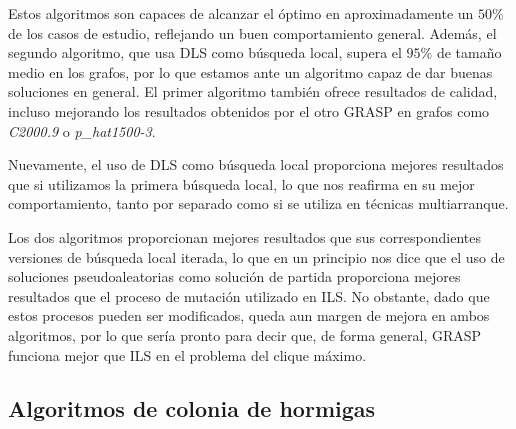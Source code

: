Estos algoritmos son capaces de alcanzar el óptimo en aproximadamente un $50\%$ de
los casos de estudio, reflejando un buen comportamiento general. Además, el segundo
algoritmo, que usa DLS como búsqueda local, supera el $95\%$ de tamaño medio en los
grafos, por lo que estamos ante un algoritmo capaz de dar buenas soluciones en
general. El primer algoritmo también ofrece resultados de calidad, incluso mejorando
los resultados obtenidos por el otro GRASP en grafos como \textit{C2000.9} o \textit{p\_hat1500-3}.

Nuevamente, el uso de DLS como búsqueda local proporciona mejores resultados que
si utilizamos la primera búsqueda local, lo que nos reafirma en su mejor comportamiento,
tanto por separado como si se utiliza en técnicas multiarranque.

Los dos algoritmos proporcionan mejores resultados que sus correspondientes versiones
de búsqueda local iterada, lo que en un principio nos dice que el uso de soluciones
pseudoaleatorias como solución de partida proporciona mejores resultados que el proceso
de mutación utilizado en ILS. No obstante, dado que estos procesos pueden ser modificados,
queda aun margen de mejora en ambos algoritmos, por lo que sería pronto para decir que,
de forma general, GRASP funciona mejor que ILS en el problema del clique máximo.

\subsection{Algoritmos de colonia de hormigas}


